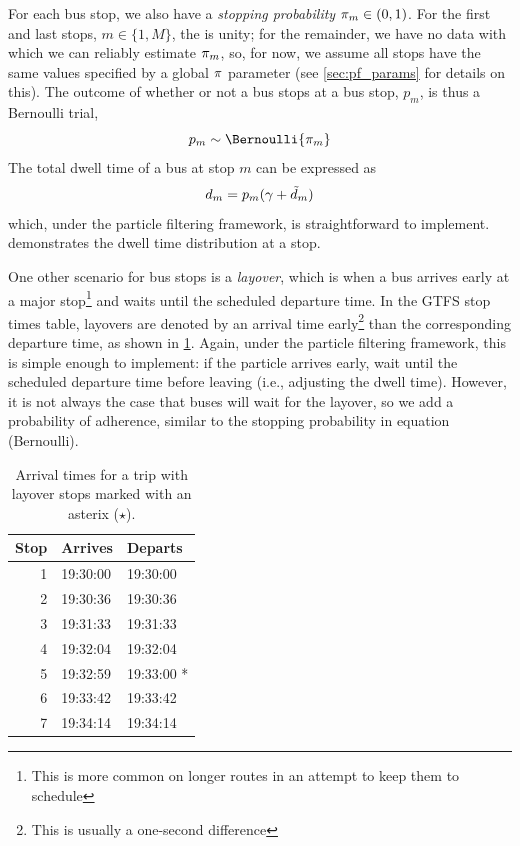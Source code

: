 For each bus stop, we also have a \emph{stopping probability} $\pi_m\in(0,1)$. For the first and last stops, $m\in\{1,M\}$, the is unity; for the remainder, we have no data with which we can reliably estimate $\pi_m$, so, for now, we assume all stops have the same values specified by a global $\pi$ parameter (see \cref{sec:pf_params} for details on this). The outcome of whether or not a bus stops at a bus stop, $p_m$, is thus a Bernoulli trial,
\begin{equation}
\label{eq:stop_pstop}
\Istop_m \sim \Bernoulli{\Prstop_m}
\end{equation}
The total dwell time of a bus at stop $m$ can be expressed as
\begin{equation}
\label{eq:stop_total_dwell_time}
d_m = p_m (\gamma + \tilde d_m)
\end{equation}
which, under the particle filtering framework, is straightforward to implement.  demonstrates the dwell time distribution at a stop.

One other scenario for bus stops is a \emph{layover}, which is when a bus arrives early at a major stop\footnote{This is more common on longer routes in an attempt to keep them to schedule} and waits until the scheduled departure time. In the GTFS stop times table, layovers are denoted by an arrival time early\footnote{This is usually a one-second difference} than the corresponding departure time, as shown in \cref{tab:layover_times}. Again, under the particle filtering framework, this is simple enough to implement: if the particle arrives early, wait until the scheduled departure time before leaving (i.e., adjusting the dwell time). However, it is not always the case that buses will wait for the layover, so we add a probability of adherence, similar to the stopping probability in equation (Bernoulli).

\begin{knitrout}\small
{}\color{fgcolor}\begin{table}

\caption{\label{tab:layover_times}Arrival times for a trip with layover stops marked with an asterix ($\star$).}
\centering
\fontsize{8}{10}\selectfont
\begin{tabular}[t]{rll}
\toprule
Stop & Arrives & Departs\\
\midrule
1 & 19:30:00 & 19:30:00\\
2 & 19:30:36 & 19:30:36\\
3 & 19:31:33 & 19:31:33\\
4 & 19:32:04 & 19:32:04\\
5 & 19:32:59 & 19:33:00 *\\
6 & 19:33:42 & 19:33:42\\
7 & 19:34:14 & 19:34:14\\
\bottomrule
\end{tabular}
\end{table}


\end{knitrout}


